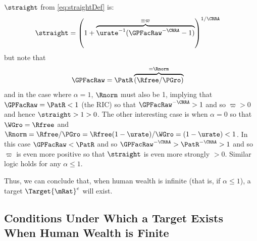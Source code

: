 \documentclass{\handout}
\begin{document}
$\straight$ from \eqref{eq:straightDef} is:
\begin{equation}\begin{gathered}\begin{aligned}
  \straight & =  \left(1+\overbrace{\urate^{-1}(\GPFacRaw^{-\CRRA}-1)}^{\equiv \varpi}\right)^{1/\CRRA}
\end{aligned}\end{gathered}\end{equation}
but note that 
\begin{equation}\begin{gathered}\begin{aligned}
  \GPFacRaw & =  \PatR \overbrace{(\Rfree/\PGro)}^{=\Rnorm}
\end{aligned}\end{gathered}\end{equation}
and in the case where $\alpha=1$, $\Rnorm$ must also be 1, implying that $\GPFacRaw = \PatR < 1$ (the RIC) so that $\GPFacRaw^{-\CRRA} > 1$ and so $\varpi > 0$ and hence $\straight > 1 > 0$.  The other interesting case is when $\alpha=0$ so that $\WGro=\Rfree$ and $\Rnorm=\Rfree/\PGro=\Rfree(1-\urate)/\WGro=(1-\urate)<1$.  In this case $\GPFacRaw < \PatR$ and so $\GPFacRaw^{-\CRRA} > \PatR^{-\CRRA} > 1$ and so $\varpi$ is even more positive so that $\straight$ is even more strongly $>0$.  Similar logic holds for any $\alpha \leq 1$.  

Thus, we can conclude that, when human wealth is infinite (that is, if $\alpha \leq 1$), a target $\Target{\mRat}^{e}$ will exist.  

\subsection{Conditions Under Which a Target Exists When Human Wealth is Finite}
\end{document}
